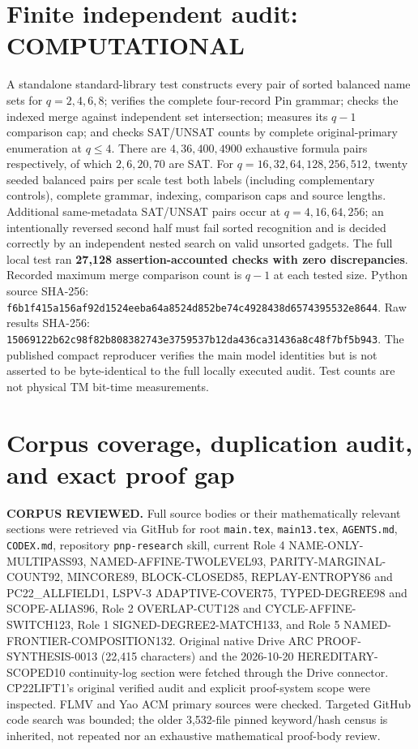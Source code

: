 \documentclass[11pt]{article}
\begin{document}
\section{Finite independent audit: COMPUTATIONAL}
A standalone standard-library test constructs every pair of sorted balanced name sets for \(q=2,4,6,8\); verifies the complete four-record Pin grammar; checks the indexed merge against independent set intersection; measures its \(q-1\) comparison cap; and checks SAT/UNSAT counts by complete original-primary enumeration at \(q\le4\). There are \(4,36,400,4900\) exhaustive formula pairs respectively, of which \(2,6,20,70\) are SAT. For \(q=16,32,64,128,256,512\), twenty seeded balanced pairs per scale test both labels (including complementary controls), complete grammar, indexing, comparison caps and source lengths. Additional same-metadata SAT/UNSAT pairs occur at \(q=4,16,64,256\); an intentionally reversed second half must fail sorted recognition and is decided correctly by an independent nested search on valid unsorted gadgets.
The full local test ran \textbf{27,128 assertion-accounted checks with zero discrepancies}. Recorded maximum merge comparison count is \(q-1\) at each tested size. Python source SHA-256:
\texttt{f6b1f415a156af92d1524eeba64a8524d852be74c4928438d6574395532e8644}.
Raw results SHA-256:
\texttt{15069122b62c98f82b808382743e3759537b12da436ca31436a8c48f7bf5b943}.
The published compact reproducer verifies the main model identities but is not asserted to be byte-identical to the full locally executed audit. Test counts are not physical TM bit-time measurements.

\section{Corpus coverage, duplication audit, and exact proof gap}
\textbf{CORPUS REVIEWED.} Full source bodies or their mathematically relevant sections were retrieved via GitHub for root \texttt{main.tex}, \texttt{main13.tex}, \texttt{AGENTS.md}, \texttt{CODEX.md}, repository \texttt{pnp-research} skill, current Role 4 NAME-ONLY-MULTIPASS93, NAMED-AFFINE-TWOLEVEL93, PARITY-MARGINAL-COUNT92, MINCORE89, BLOCK-CLOSED85, REPLAY-ENTROPY86 and PC22\_ALLFIELD1, LSPV-3 ADAPTIVE-COVER75, TYPED-DEGREE98 and SCOPE-ALIAS96, Role 2 OVERLAP-CUT128 and CYCLE-AFFINE-SWITCH123, Role 1 SIGNED-DEGREE2-MATCH133, and Role 5 NAMED-FRONTIER-COMPOSITION132. Original native Drive ARC PROOF-SYNTHESIS-0013 (22,415 characters) and the 2026-10-20 HEREDITARY-SCOPED10 continuity-log section were fetched through the Drive connector. CP22LIFT1's original verified audit and explicit proof-system scope were inspected. FLMV and Yao ACM primary sources were checked. Targeted GitHub code search was bounded; the older 3,532-file pinned keyword/hash census is inherited, not repeated nor an exhaustive mathematical proof-body review.
\end{document}
